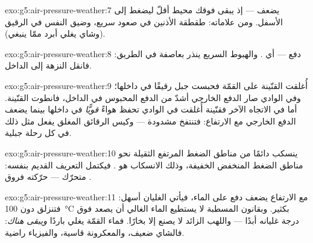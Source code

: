 \begin{solution}{exo:g5:air-pressure-weather:7}
يضعف --- إذ يبقى فوقك محيط  أقلّ ليضغط إلى الأسفل. ومن
علاماته: طقطقة الأذنين في صعود سريع، وضيق النفس في 
الرقيق (وشاي يغلي أبرد ممّا ينبغي).
\end{solution}

\begin{solution}{exo:g5:air-pressure-weather:8}
دفع  --- أي . والهبوط السريع ينذر بعاصفة
في الطريق: فانقل النزهة إلى الداخل.
\end{solution}

\begin{solution}{exo:g5:air-pressure-weather:9}
أُغلقت القنّينة على القمّة فحبست  جبل رقيقًا في داخلها؛
وفي الوادي صار الدفع الخارجي أشدّ من الدفع المحبوس في الداخل،
فانطوت القنّينة. أما في الاتجاه الآخر فقنّينة أُغلقت في الوادي
تحفظ هواءً \emph{قويًّا} في داخلها بينما يضعف الدفع الخارجي مع
الارتفاع: فتنتفخ مشدودة --- وكيس الرقائق المغلق يفعل مثل ذلك في
كل رحلة جبلية.
\end{solution}

\begin{solution}{exo:g5:air-pressure-weather:10}
ينسكب  دائمًا من مناطق الضغط المرتفع الثقيلة نحو مناطق
الضغط المنخفض الخفيفة، وذلك الانسكاب هو . فيكتمل التعريف
القديم بنفسه:   متحرّك --- حرّكته فروق .
\end{solution}

\begin{solution}{exo:g5:air-pressure-weather:11}
مع الارتفاع يضعف دفع  على الماء، فيأتي الغليان
أسهل: فتنزلق  دون \qty{100}{\celsius} بكثير. وبقانون
المسطبة لا يستطيع الماء الغالي أن يصعد فوق درجة غليانه أبدًا ---
واللهب الزائد لا يصنع إلا بخارًا. فماء القمّة يغلي باردًا
\emph{ويبقى هناك}: فالشاي ضعيف، والمعكرونة قاسية، والفيزياء
راضية.
\end{solution}
